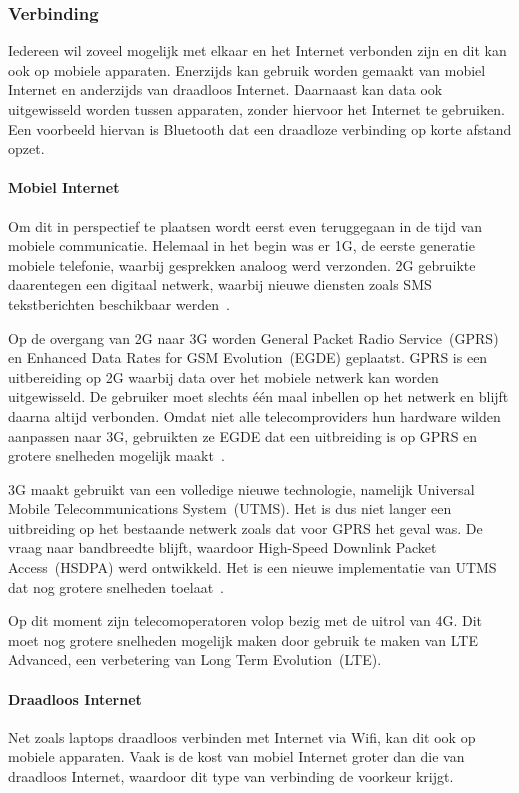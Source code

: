\subsubsection{Verbinding}
Iedereen wil zoveel mogelijk met elkaar en het Internet verbonden zijn en dit kan ook op mobiele apparaten. 
Enerzijds kan gebruik worden gemaakt van mobiel Internet en anderzijds van draadloos Internet.
Daarnaast kan data ook uitgewisseld worden tussen apparaten, zonder hiervoor het Internet te gebruiken.
Een voorbeeld hiervan is Bluetooth dat een draadloze verbinding op korte afstand opzet.

\paragraph{Mobiel Internet}
Om dit in perspectief te plaatsen wordt eerst even teruggegaan in de tijd van mobiele communicatie.
Helemaal in het begin was er 1G, de eerste generatie mobiele telefonie, waarbij gesprekken analoog werd verzonden.
2G gebruikte daarentegen een digitaal netwerk, waarbij nieuwe diensten zoals SMS tekstberichten beschikbaar werden~\cite{Miami2008}.

Op de overgang van 2G naar 3G worden General Packet Radio Service~(GPRS) en Enhanced Data Rates for GSM Evolution~(EGDE) geplaatst.
GPRS is een uitbereiding op 2G waarbij data over het mobiele netwerk kan worden uitgewisseld.
De gebruiker moet slechts één maal inbellen op het netwerk en blijft daarna altijd verbonden.
Omdat niet alle telecomproviders hun hardware wilden aanpassen naar 3G, gebruikten ze EGDE dat een uitbreiding is op GPRS en grotere snelheden mogelijk maakt~\cite{Lauwers2007}.

3G maakt gebruikt van een volledige nieuwe technologie, namelijk Universal Mobile Telecommunications System~(UTMS).
Het is dus niet langer een uitbreiding op het bestaande netwerk zoals dat voor GPRS het geval was.
De vraag naar bandbreedte blijft, waardoor High-Speed Downlink Packet Access~(HSDPA) werd ontwikkeld. 
Het is een nieuwe implementatie van UTMS dat nog grotere snelheden toelaat~\cite{Lauwers2007}.

Op dit moment zijn telecomoperatoren volop bezig met de uitrol van 4G.
Dit moet nog grotere snelheden mogelijk maken door gebruik te maken van LTE Advanced, een verbetering van Long Term Evolution~(LTE).

\paragraph{Draadloos Internet}
Net zoals laptops draadloos verbinden met Internet via Wifi, kan dit ook op mobiele apparaten.
Vaak is de kost van mobiel Internet groter dan die van draadloos Internet, waardoor dit type van verbinding de voorkeur krijgt.

